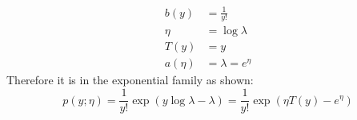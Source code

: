\begin{answer}
    \begin{align*}
        b(y) &= \frac{1}{y!} \\
        \eta &= \log \lambda \\
        T(y) &= y \\
        a(\eta) &= \lambda = e^\eta
    \end{align*}
    Therefore it is in the exponential family as shown:
    $$
        p(y; \eta) = \frac{1}{y!} \exp(y \log \lambda - \lambda) = \frac{1}{y!} \exp(\eta T(y) - e^\eta)
    $$
\end{answer}
